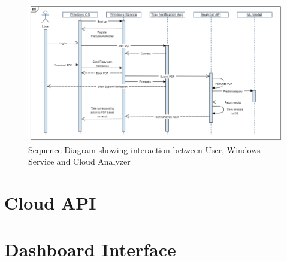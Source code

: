 \begin{figure}[H]
	\centerline{\includegraphics[scale=0.55]{figures/sequence.png}}  
	\caption{Sequence Diagram showing interaction between User, Windows Service and Cloud Analyzer}
	\label{deployment}
\end{figure}

\section{Cloud API}
\label{section:cloudApi}

\section{Dashboard Interface}
\label{section:dashboard}